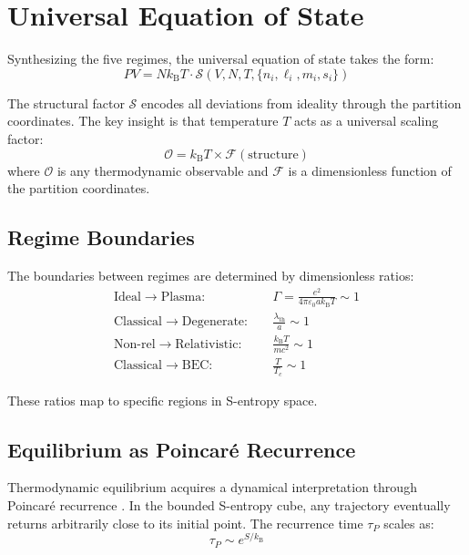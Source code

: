 \documentclass[twocolumn,aps,prd,superscriptaddress,nofootinbib]{revtex4-2}
\newcommand{\kB}{k_{\mathrm{B}}}
\begin{document}
\section{Universal Equation of State}
\label{sec:eos}

Synthesizing the five regimes, the universal equation of state takes the form:
\begin{equation}
\boxed{PV = N\kB T \cdot \mathcal{S}(V, N, T, \{n_i, \ell_i, m_i, s_i\})}
\label{eq:universal}
\end{equation}

The structural factor $\mathcal{S}$ encodes all deviations from ideality through the partition coordinates. The key insight is that temperature $T$ acts as a universal scaling factor:
\begin{equation}
\mathcal{O} = \kB T \times \mathcal{F}(\text{structure})
\end{equation}
where $\mathcal{O}$ is any thermodynamic observable and $\mathcal{F}$ is a dimensionless function of the partition coordinates.

\subsection{Regime Boundaries}

The boundaries between regimes are determined by dimensionless ratios:
\begin{align}
\text{Ideal} \to \text{Plasma}: \quad & \Gamma = \frac{e^2}{4\pi\varepsilon_0 a\kB T} \sim 1 \\
\text{Classical} \to \text{Degenerate}: \quad & \frac{\lambda_{\text{th}}}{a} \sim 1 \\
\text{Non-rel} \to \text{Relativistic}: \quad & \frac{\kB T}{mc^2} \sim 1 \\
\text{Classical} \to \text{BEC}: \quad & \frac{T}{T_c} \sim 1
\end{align}

These ratios map to specific regions in S-entropy space.

\subsection{Equilibrium as Poincar\'{e} Recurrence}

Thermodynamic equilibrium acquires a dynamical interpretation through Poincar\'{e} recurrence \cite{poincare1890probleme, cornfeld1982ergodic}. In the bounded S-entropy cube, any trajectory eventually returns arbitrarily close to its initial point. The recurrence time $\tau_P$ scales as:
\begin{equation}
\tau_P \sim e^{S/\kB}
\end{equation}
\end{document}
